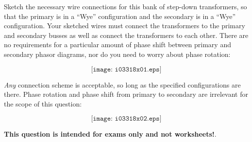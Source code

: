 

Sketch the necessary wire connections for this bank of step-down transformers, so that the primary is in a ``Wye'' configuration and the secondary is in a ``Wye'' configuration.  Your sketched wires must connect the transformers to the primary and secondary busses as well as connect the transformers to each other.  There are no requirements for a particular amount of phase shift between primary and secondary phasor diagrams, nor do you need to worry about phase rotation:

$$\texttt{[image: i03318x01.eps]}$$







{\it Any} connection scheme is acceptable, so long as the specified configurations are there.  Phase rotation and phase shift from primary to secondary are irrelevant for the scope of this question:

$$\texttt{[image: i03318x02.eps]}$$







{\bf This question is intended for exams only and not worksheets!}.



